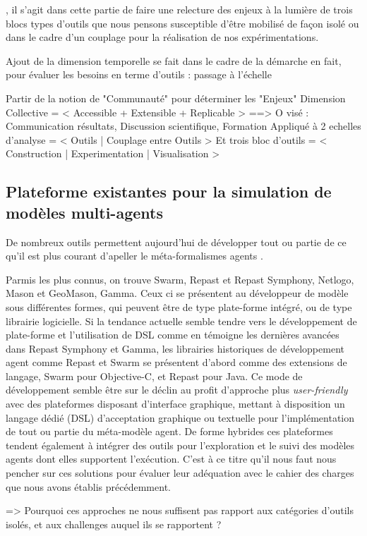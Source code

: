 , il s'agit dans cette partie de faire une relecture des enjeux à la lumière de trois blocs types d'outils que nous pensons susceptible d'être mobilisé de façon isolé ou dans le cadre d'un couplage pour la réalisation de nos expérimentations.

Ajout de la dimension temporelle se fait dans le cadre de la démarche en fait, pour évaluer les besoins en terme d'outils : passage à l'échelle

Partir de la notion de "Communauté" pour déterminer les "Enjeux"
Dimension Collective = < Accessible + Extensible + Replicable > ==> O visé : Communication résultats, Discussion scientifique, Formation
Appliqué à 2 echelles d'analyse = < Outils | Couplage entre Outils > 
Et trois bloc d'outils = < Construction | Experimentation | Visualisation >


\subsection{Plateforme existantes pour la simulation de modèles multi-agents}

De nombreux outils permettent aujourd'hui de développer tout ou partie de ce qu'il est plus courant d'apeller le méta-formalismes agents \autocite{Treuil2008}. 

Parmis les plus connus, on trouve Swarm, Repast et Repast Symphony, Netlogo,  Mason et GeoMason, Gamma. Ceux ci se présentent au développeur de modèle sous différentes formes, qui peuvent être de type plate-forme intégré, ou de type librairie logicielle. Si la tendance actuelle semble tendre vers le développement de plate-forme et l'utilisation de DSL comme en témoigne les dernières avancées dans Repast Symphony et Gamma, les librairies historiques de développement agent comme Repast et Swarm se présentent d'abord comme des extensions de langage, Swarm pour Objective-C, et Repast pour Java. Ce mode de développement semble être sur le déclin au profit d'approche plus \textit{user-friendly} avec des plateformes disposant d'interface graphique, mettant à disposition un langage dédié (DSL) d'acceptation graphique ou textuelle pour l'implémentation de tout ou partie du méta-modèle agent. De forme hybrides ces plateformes tendent également à intégrer des outils pour l'exploration et le suivi des modèles agents dont elles supportent l’exécution. C'est à ce titre qu'il nous faut nous pencher sur ces solutions pour évaluer leur adéquation avec le cahier des charges que nous avons établis précédemment.

=> Pourquoi ces approches ne nous suffisent pas rapport aux catégories d'outils isolés, et aux challenges auquel ils se rapportent ? 

